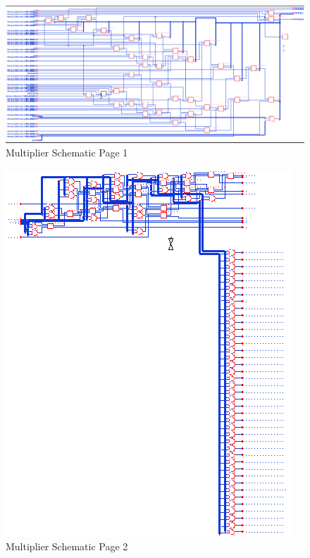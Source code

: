 \documentclass[11pt]{article}
\begin{document}
	
		\begin{figure}[H] 
			\centering 
			\includegraphics[width=\textwidth,height=\dimexpr\textheight-4\baselineskip-\abovecaptionskip-\belowcaptionskip\relax,keepaspectratio]{"Pictures/Multiplier Schematic Page 1"}
			\caption{Multiplier Schematic Page 1} 
			\label{fig:Multiplier-Schematic-Page-1} 
		\end{figure}
		
		
		\begin{figure}[H] 
			\centering 
			\includegraphics[width=\textwidth,height=\dimexpr\textheight-4\baselineskip-\abovecaptionskip-\belowcaptionskip\relax,keepaspectratio]{"Pictures/Multiplier Schematic Page 2"}
			\caption{Multiplier Schematic Page 2} 
			\label{fig:Multiplier-Schematic-Page-2} 
		\end{figure}
	
\end{document}
